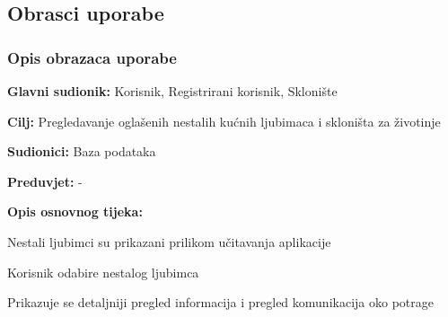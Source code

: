 			\eject 
			
			
				
			\subsection{Obrasci uporabe}
				
				\subsubsection{Opis obrazaca uporabe}		

					\noindent {}
					\begin{packed_item}
	
						\item \textbf{Glavni sudionik: }Korisnik, Registrirani korisnik, Sklonište
						\item  \textbf{Cilj:} Pregledavanje oglašenih nestalih kućnih ljubimaca i skloništa za životinje
						\item  \textbf{Sudionici:} Baza podataka
						\item  \textbf{Preduvjet:} -
						\item  \textbf{Opis osnovnog tijeka:}
						
						\item[] \begin{packed_enum}
	
							\item Nestali ljubimci su prikazani prilikom učitavanja aplikacije
							\item Korisnik odabire nestalog ljubimca
							\item Prikazuje se detaljniji pregled informacija i pregled komunikacija oko potrage
						\end{packed_enum}
						
					\end{packed_item}
				
